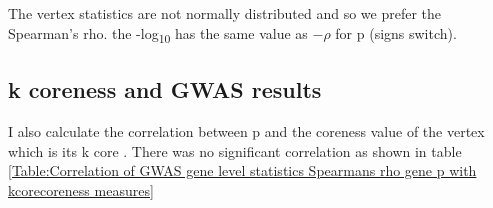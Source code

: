 The vertex statistics are not normally distributed  and so we prefer the Spearman's rho. the -log\textsubscript{10} has the same value as $-\rho$ for p (signs switch).



 \subsection{k coreness and GWAS results}
I also calculate the correlation between p and the coreness value of the vertex which is its k core . There was no significant correlation as shown in table \ref{Table:Correlation of GWAS gene level statistics Spearmans rho gene p  with kcorecoreness measures}

